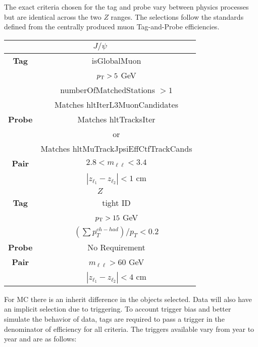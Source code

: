 The exact criteria chosen for the tag and probe vary between physics processes but are identical across the two $Z$ ranges. The selections follow the standards defined from the centrally produced muon Tag-and-Probe efficiencies.\\

\begin{tabular}{|c|c|c|}
\hline 
\multicolumn{3}{|c|}{$J/\psi$} \\ 
\hline 
\textbf{Tag} & \multicolumn{2}{c|}{ isGlobalMuon } \\
	& \multicolumn{2}{c|}{ $p_{\mathrm{T}} > 5$ GeV} \\ 
	& \multicolumn{2}{c|}{ numberOfMatchedStations $> 1$} \\
	& \multicolumn{2}{c|}{ Matches hltIterL3MuonCandidates} \\
\hline 
\textbf{Probe} & \multicolumn{2}{c|}{Matches hltTracksIter} \\ 
	  & \multicolumn{2}{c|}{ or } \\
	  & \multicolumn{2}{c|}{Matches hltMuTrackJpsiEffCtfTrackCands } \\
\hline 
\textbf{Pair} & \multicolumn{2}{c|}{$ 2.8 < m_{\ell\ell} < 3.4$} \\
	 & \multicolumn{2}{c|}{$ | z_{\ell_1} - z_{\ell_2} | < 1 $ cm } \\
\hline 
\multicolumn{3}{|c|}{$Z$} \\ 
\hline 
\textbf{Tag} & \multicolumn{2}{c|}{tight ID} \\
			& \multicolumn{2}{c|}{$p_{\mathrm{T}} > 15$ GeV} \\
			& \multicolumn{2}{c|}{ $(\sum p_T^{ch-had})/p_T < 0.2$ } \\
\hline 
\textbf{Probe} & \multicolumn{2}{c|}{No Requirement} \\ 
\hline 
\textbf{Pair} & \multicolumn{2}{c|}{$m_{\ell\ell} > 60$ GeV} \\ 
			  & \multicolumn{2}{c|}{$|z_{\ell_1} - z_{\ell_2}| < 4$ cm} \\
\hline 
\end{tabular} 




For MC there is an inherit difference in the objects selected. Data will also have an implicit selection due to triggering. To account trigger bias and better simulate the behavior of data, tags are required to pass a trigger in the denominator of efficiency for all criteria. The triggers available vary from year to year and are as follows:\\

